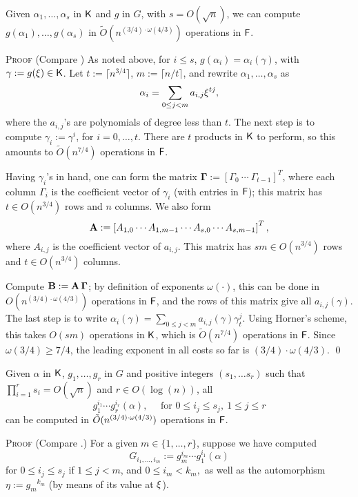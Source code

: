 \begin{lemma}
  \label{lem:modcom}
  Given $\alpha_1,\dots,\alpha_s$ in ${\mathsf{K}}$ and $g$ in $G$, with $s = O(\sqrt{n})$, we can compute
  $g(\alpha_1),\dots,g(\alpha_s)$ in $\tilde
  O(n^{(3/4)\cdot\omega(4/3)})$ operations in ${\mathsf{F}}$.
\end{lemma}
\noindent\textsc{Proof}
(Compare \cite[Lemma~3]{KalSho98}) As noted above, for $i\le s$,
  $g(\alpha_i) = \alpha_i(\gamma)$, with $\gamma := g(\xi) \in {\mathsf{K}}$.
  Let $t := \lceil n^{3/4} \rceil$, $m:=\lceil n/t\rceil$, and rewrite $\alpha_1 , \ldots , \alpha_s$ as 
$$\alpha_i = \sum_{0 \leq j < m} a_{i,j}\xi^{tj},$$ where the
  $a_{i,j}$'s are polynomials of degree less than $t$. The next step
  is to compute $\gamma_i := \gamma^i$, for $i = 0 , \ldots , t$.
  There are $t$ products in ${\mathsf{K}}$ to perform, so this amounts to
  $\tilde{O}(n^{7/4})$ operations in ${\mathsf{F}}$.

  Having $\gamma_i$'s in hand, one can form the matrix
  $\boldsymbol{\Gamma} := \left[ \Gamma_0 ~ \cdots ~ \Gamma_{t-1}
    \right]^T$, where each column $\Gamma_i$ is the coefficient vector
  of $\gamma_i$ (with entries in ${\mathsf{F}}$); this matrix has $t \in
  O(n^{3/4})$ rows and $n$ columns. We also form
  $$\mat A := \left[{A}_{1,0} \cdots {A}_{1,m-1} \cdots
    {A}_{s,0} \cdots {A}_{s,m-1}\right]^T,$$ where
  ${A}_{i,j}$ is the coefficient vector of $a_{i,j}$. This matrix 
  has $s m \in O(n^{3/4})$ rows and $t \in O(n^{3/4})$ columns.

  Compute $\mat B:=\mat A\, \boldsymbol{\Gamma}$; by
  definition of exponents $\omega(\cdot )$, this can be done in
  $O(n^{(3/4)\cdot \omega(4/3)})$ operations in ${\mathsf{F}}$, and the rows of this matrix
  give all $a_{i,j}(\gamma)$.  The last step  is to write $\alpha_i(\gamma) = \sum_{0
    \leq j < m} a_{i,j}(\gamma) \gamma_t^{j}.$ Using Horner's scheme,
  this takes $O(sm)$ operations in ${\mathsf{K}}$, which is $\tilde{O}(n^{7/4})$
  operations in ${\mathsf{F}}$. Since  $\omega(3/4) \ge 7/4$,
  the leading exponent in all costs so far is
  $(3/4)\cdot\omega(4/3)$.
\qed

\begin{lemma}\label{lem:selfcomp}
Given $\alpha$ in ${\mathsf{K}}$, $g_1, \ldots , g_{r}$ in $G$ and positive integers $(s_1, \ldots s_r)$ such
that $\prod_{i = 1}^r s_i = O(\sqrt{n})$ and $r \in O(\log(n))$, all
  $$g_1^{i_1}\cdots g_r^{i_r}(\alpha) ,\quad \text{~for~} 0 \leq i_j
\leq s_j,\ 1 \leq j \leq r$$ can be computed in $\tilde{O}(n^{(3/4)\cdot \omega(4/3)})$
operations in ${\mathsf{F}}$.
\end{lemma}
\noindent\textsc{Proof}
(Compare \cite[Lemma~4]{KalSho98}.) For a given  $m\in\{1,\dots,r\}$, suppose we have computed 
  $$G_{i_1,\dots,i_m}:=g_m^{i_m}\cdots g_1^{i_1}(\alpha)$$ for $0 \leq
  i_j \leq s_j$ if $1 \leq j < m$, and $0 \leq i_m < k_m,$ as well as
  the automorphism $\eta:={g_m}^{k_m}$ (by means of its value at $\xi$).
  
